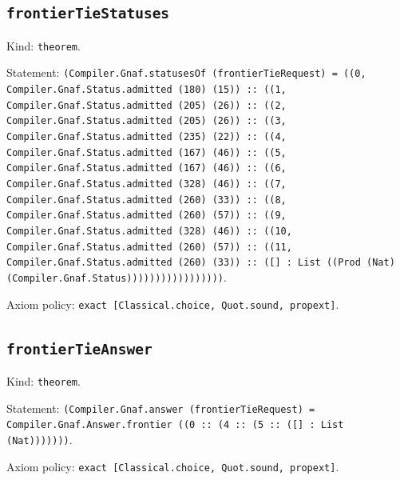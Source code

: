 \documentclass[11pt]{article}
\begin{document}
\subsection*{\texttt{frontierTieStatuses}}
\noindent Kind: \texttt{theorem}.\par
\noindent Statement: \texttt{(Compiler.Gnaf.statusesOf (frontierTieRequest) = ((0, Compiler.Gnaf.Status.admitted (180) (15)) :: ((1, Compiler.Gnaf.Status.admitted (205) (26)) :: ((2, Compiler.Gnaf.Status.admitted (205) (26)) :: ((3, Compiler.Gnaf.Status.admitted (235) (22)) :: ((4, Compiler.Gnaf.Status.admitted (167) (46)) :: ((5, Compiler.Gnaf.Status.admitted (167) (46)) :: ((6, Compiler.Gnaf.Status.admitted (328) (46)) :: ((7, Compiler.Gnaf.Status.admitted (260) (33)) :: ((8, Compiler.Gnaf.Status.admitted (260) (57)) :: ((9, Compiler.Gnaf.Status.admitted (328) (46)) :: ((10, Compiler.Gnaf.Status.admitted (260) (57)) :: ((11, Compiler.Gnaf.Status.admitted (260) (33)) :: ([] : List ((Prod (Nat) (Compiler.Gnaf.Status)))))))))))))))))}.\par
\noindent Axiom policy: \texttt{exact [Classical.choice, Quot.sound, propext]}.\par
\subsection*{\texttt{frontierTieAnswer}}
\noindent Kind: \texttt{theorem}.\par
\noindent Statement: \texttt{(Compiler.Gnaf.answer (frontierTieRequest) = Compiler.Gnaf.Answer.frontier ((0 :: (4 :: (5 :: ([] : List (Nat)))))))}.\par
\noindent Axiom policy: \texttt{exact [Classical.choice, Quot.sound, propext]}.\par
\end{document}
